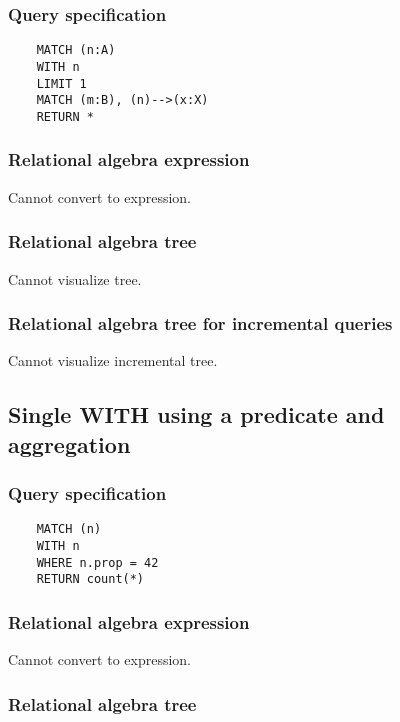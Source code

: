 	\subsubsection*{Query specification}

	\begin{lstlisting}
	MATCH (n:A)
	WITH n
	LIMIT 1
	MATCH (m:B), (n)-->(x:X)
	RETURN *
	\end{lstlisting}


	\subsubsection*{Relational algebra expression}

	Cannot convert to expression.

	\subsubsection*{Relational algebra tree}

	Cannot visualize tree.

	\subsubsection*{Relational algebra tree for incremental queries}

	Cannot visualize incremental tree.
	\subsection{Single WITH using a predicate and aggregation}

	\subsubsection*{Query specification}

	\begin{lstlisting}
	MATCH (n)
	WITH n
	WHERE n.prop = 42
	RETURN count(*)
	\end{lstlisting}


	\subsubsection*{Relational algebra expression}

	Cannot convert to expression.

	\subsubsection*{Relational algebra tree}

